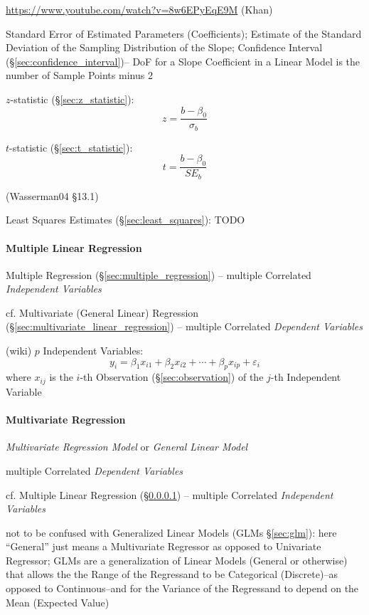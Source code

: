 \url{https://www.youtube.com/watch?v=8w6EPyEqE9M} (Khan)

Standard Error of Estimated Parameters (Coefficients); Estimate of the Standard
Deviation of the Sampling Distribution of the Slope; Confidence Interval
(\S\ref{sec:confidence_interval})-- DoF for a Slope Coefficient in a Linear
Model is the number of Sample Points minus 2

$z$-statistic (\S\ref{sec:z_statistic}):
\[
  z = \frac{b - \beta_0}{\sigma_b}
\]

$t$-statistic (\S\ref{sec:t_statistic}):
\[
  t = \frac{b - \beta_0}{SE_b}
\]

\asterism

(Wasserman04 \S13.1)

Least Squares Estimates (\S\ref{sec:least_squares}): TODO



\paragraph{Multiple Linear Regression}
\label{sec:multiple_linear_regression}\hfill

Multiple Regression (\S\ref{sec:multiple_regression}) --
multiple Correlated \emph{Independent Variables}

cf. Multivariate (General Linear) Regression
(\S\ref{sec:multivariate_linear_regression}) -- multiple Correlated
\emph{Dependent Variables}

(wiki) $p$ Independent Variables:
\[
  y_i = \beta_1 x_{i1} + \beta_2 x_{i2} + \cdots + \beta_p x_{ip} +
    \varepsilon_i
\]
where $x_{ij}$ is the $i$-th Observation (\S\ref{sec:observation}) of the $j$-th
Independent Variable



\paragraph{Multivariate Regression}
\label{sec:multivariate_regression}\hfill

\emph{Multivariate Regression Model} or \emph{General Linear Model}

multiple Correlated \emph{Dependent Variables}

cf. Multiple Linear Regression (\S\ref{sec:multiple_linear_regression})
-- multiple Correlated \emph{Independent Variables}

\fist not to be confused with Generalized Linear Models (GLMs \S\ref{sec:glm}):
here ``General'' just means a Multivariate Regressor as opposed to Univariate
Regressor; GLMs are a generalization of Linear Models (General or otherwise)
that allows the the Range of the Regressand to be Categorical (Discrete)--as
opposed to Continuous--and for the Variance of the Regressand to depend on the
Mean (Expected Value)

